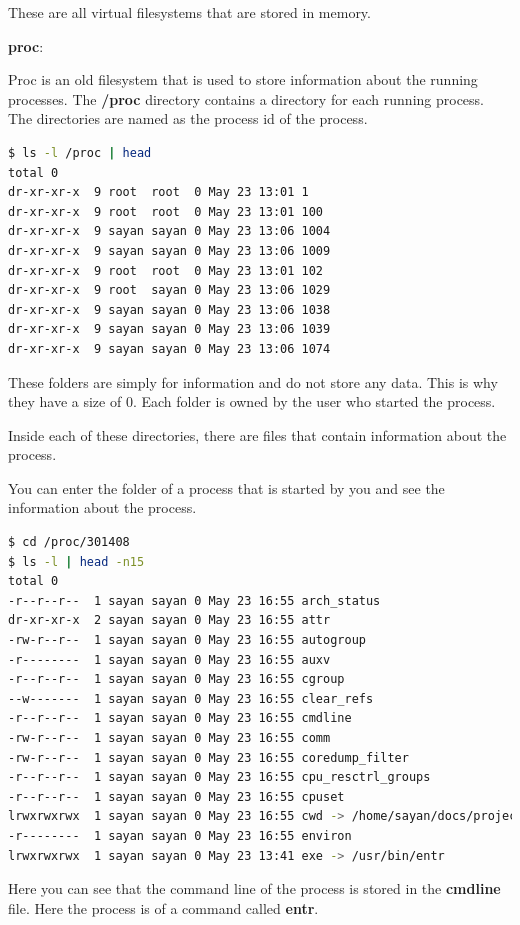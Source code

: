 These are all virtual filesystems that are stored in memory.

\textbf{proc}:

Proc is an old filesystem that is used to store information about the running processes.
The \textbf{/proc} directory contains a directory for each running process.
The directories are named as the process id of the process.

\begin{lstlisting}[language=bash]
$ ls -l /proc | head
total 0
dr-xr-xr-x  9 root  root  0 May 23 13:01 1
dr-xr-xr-x  9 root  root  0 May 23 13:01 100
dr-xr-xr-x  9 sayan sayan 0 May 23 13:06 1004
dr-xr-xr-x  9 sayan sayan 0 May 23 13:06 1009
dr-xr-xr-x  9 root  root  0 May 23 13:01 102
dr-xr-xr-x  9 root  sayan 0 May 23 13:06 1029
dr-xr-xr-x  9 sayan sayan 0 May 23 13:06 1038
dr-xr-xr-x  9 sayan sayan 0 May 23 13:06 1039
dr-xr-xr-x  9 sayan sayan 0 May 23 13:06 1074
\end{lstlisting}

These folders are simply for information and do not store any data.
This is why they have a size of 0.
Each folder is owned by the user who started the process.

Inside each of these directories, there are files that contain information about the process.

You can enter the folder of a process that is started by you and see the information about the process.

\begin{lstlisting}[language=bash]
$ cd /proc/301408
$ ls -l | head -n15
total 0
-r--r--r--  1 sayan sayan 0 May 23 16:55 arch_status
dr-xr-xr-x  2 sayan sayan 0 May 23 16:55 attr
-rw-r--r--  1 sayan sayan 0 May 23 16:55 autogroup
-r--------  1 sayan sayan 0 May 23 16:55 auxv
-r--r--r--  1 sayan sayan 0 May 23 16:55 cgroup
--w-------  1 sayan sayan 0 May 23 16:55 clear_refs
-r--r--r--  1 sayan sayan 0 May 23 16:55 cmdline
-rw-r--r--  1 sayan sayan 0 May 23 16:55 comm
-rw-r--r--  1 sayan sayan 0 May 23 16:55 coredump_filter
-r--r--r--  1 sayan sayan 0 May 23 16:55 cpu_resctrl_groups
-r--r--r--  1 sayan sayan 0 May 23 16:55 cpuset
lrwxrwxrwx  1 sayan sayan 0 May 23 16:55 cwd -> /home/sayan/docs/projects/sc-handbook
-r--------  1 sayan sayan 0 May 23 16:55 environ
lrwxrwxrwx  1 sayan sayan 0 May 23 13:41 exe -> /usr/bin/entr
\end{lstlisting}

Here you can see that the command line of the process is stored in the \textbf{cmdline} file.
Here the process is of a command called \textbf{entr}.

